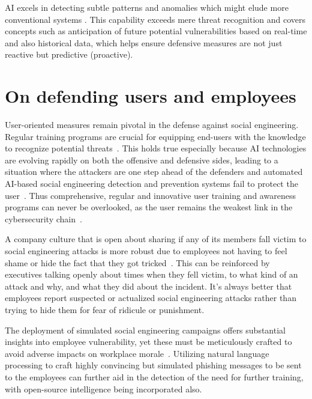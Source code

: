 AI excels in detecting subtle patterns and anomalies which might elude more conventional systems \citep{fakhouri_AI_Driven_Solutions_SE_Attacks_2024}. This capability exceeds mere threat recognition and covers concepts such as anticipation of future potential vulnerabilities based on real-time and also historical data, which helps ensure defensive measures are not just reactive but predictive (proactive).

\section{On defending users and employees}
\begin{comment}
\end{comment}

User-oriented measures remain pivotal in the defense against social engineering. Regular training programs are crucial for equipping end-users with the knowledge to recognize potential threats~\citep{hadnagy_Social_Engineering_The_Science_2018}. This holds true especially because AI technologies are evolving rapidly on both the offensive and defensive sides, leading to a situation where the attackers are one step ahead of the defenders and automated AI-based social engineering detection and prevention systems fail to protect the user~\citep{fakhouri_AI_Driven_Solutions_SE_Attacks_2024}. Thus comprehensive, regular and innovative user training and awareness programs can never be overlooked, as the user remains the weakest link in the cybersecurity chain~\citep{mitnick_The_Art_of_Deception_2003}.

A company culture that is open about sharing if any of its members fall victim to social engineering attacks is more robust due to employees not having to feel shame or hide the fact that they got tricked~\citep{hadnagy_Social_Engineering_The_Science_2018}. This can be reinforced by executives talking openly about times when they fell victim, to what kind of an attack and why, and what they did about the incident. It's always better that employees report suspected or actualized social engineering attacks rather than trying to hide them for fear of ridicule or punishment.

The deployment of simulated social engineering campaigns offers substantial insights into employee vulnerability, yet these must be meticulously crafted to avoid adverse impacts on workplace morale~\citep{mitnick_The_Art_of_Deception_2003}. Utilizing natural language processing to craft highly convincing but simulated phishing messages to be sent to the employees can further aid in the detection of the need for further training, with open-source intelligence being incorporated also.

